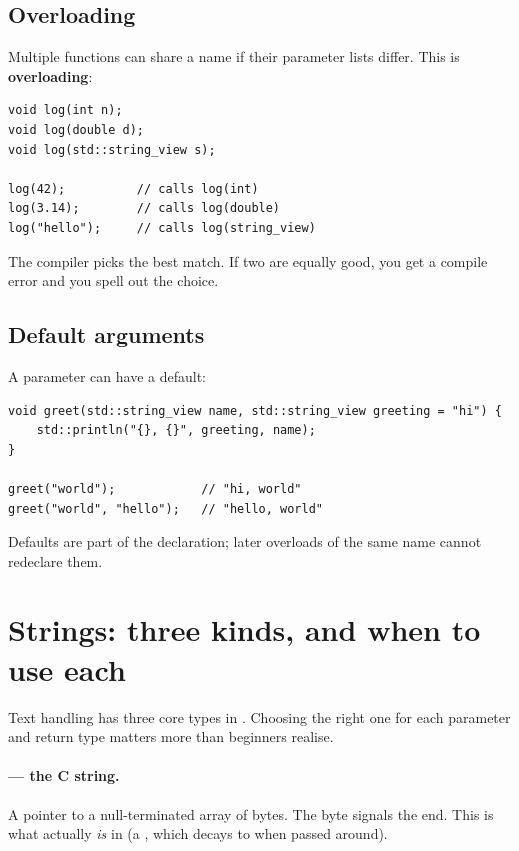 \subsection{Overloading}

Multiple functions can share a name if their parameter lists differ.
This is \textbf{overloading}:

\begin{lstlisting}
void log(int n);
void log(double d);
void log(std::string_view s);

log(42);          // calls log(int)
log(3.14);        // calls log(double)
log("hello");     // calls log(string_view)
\end{lstlisting}

The compiler picks the best match. If two are equally good, you get
a compile error and you spell out the choice.

\subsection{Default arguments}

A parameter can have a default:

\begin{lstlisting}
void greet(std::string_view name, std::string_view greeting = "hi") {
    std::println("{}, {}", greeting, name);
}

greet("world");            // "hi, world"
greet("world", "hello");   // "hello, world"
\end{lstlisting}

Defaults are part of the declaration; later overloads of the same
name cannot redeclare them.

\section{Strings: three kinds, and when to use each}
\label{sec:cpp:strings}

Text handling has three core types in \cpp{}. Choosing the right one
for each parameter and return type matters more than beginners
realise.

\paragraph{ --- the C string.}
A pointer to a null-terminated array of bytes. The 
byte signals the end. This is what  actually \emph{is}
in \cpp{} (a , which decays to  when passed around).

